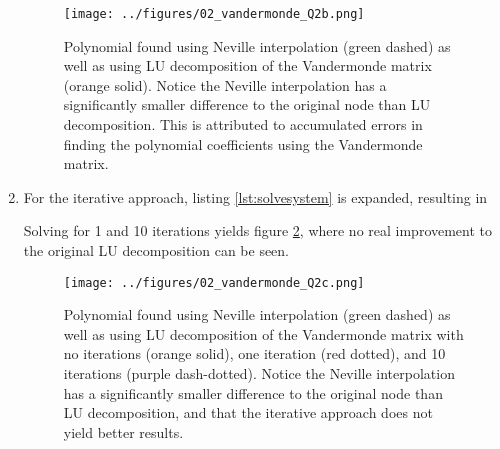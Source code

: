 \begin{enumerate}[label=(\alph*)]
\begin{figure}[H]
    \centering
    \texttt{[image: ../figures/02\_vandermonde\_Q2b.png]}
	\caption{Polynomial found using Neville interpolation (green dashed) as well as using LU decomposition of the Vandermonde matrix (orange solid). Notice the Neville interpolation has a significantly smaller difference to the original node than LU decomposition. This is attributed to accumulated errors in finding the polynomial coefficients using the Vandermonde matrix.}
    \label{fig:Q2b}
\end{figure}

\item For the iterative approach, listing \ref{lst:solvesystem} is expanded, resulting in

Solving for 1 and 10 iterations yields figure \ref{fig:Q2c}, where no real improvement to the original LU decomposition can be seen.

\begin{figure}[H]
    \centering
    \texttt{[image: ../figures/02\_vandermonde\_Q2c.png]}
	\caption{Polynomial found using Neville interpolation (green dashed) as well as using LU decomposition of the Vandermonde matrix with no iterations (orange solid), one iteration (red dotted), and 10 iterations (purple dash-dotted). Notice the Neville interpolation has a significantly smaller difference to the original node than LU decomposition, and that the iterative approach does not yield better results.}
    \label{fig:Q2c}
\end{figure}



\end{enumerate}
